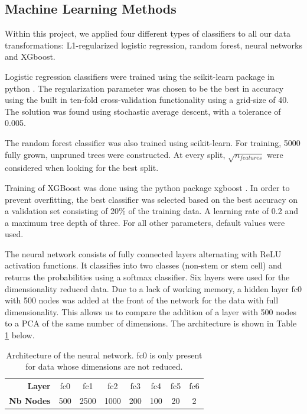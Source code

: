 \documentclass[10pt,conference,compsocconf]{IEEEtran}
\begin{document}
\subsection{Machine Learning Methods}
Within this project, we applied four different types of classifiers to all our data transformations: L1-regularized logistic regression, random forest, neural networks and XGboost.
\par
Logistic regression classifiers were trained using the scikit-learn package in python \cite{scikit-learn}. The regularization parameter was chosen to be the best in accuracy using the built in ten-fold cross-validation functionality using a grid-size of 40. The solution was found using stochastic average descent, with a tolerance of 0.005. 
\par
The random forest classifier was also trained using scikit-learn. For training, 5000 fully grown, unpruned trees were constructed. At every split, $\sqrt{n_{features}}$ were considered when looking for the best split.
\par
Training of XGBoost was done using the python package xgboost \cite{Chen:2016:XST:2939672.2939785}. In order to prevent overfitting, the best classifier was selected based on the best  accuracy on a validation set consisting of 20\% of the training data. A learning rate of 0.2 and a maximum tree depth of three. For all other parameters, default values were used.  
\par
The neural network consists of fully connected layers alternating with ReLU activation functions. It classifies into two classes (non-stem or stem cell) and returns the probabilities using a softmax classifier. Six layers were used for the dimensionality reduced data. Due to a lack of working memory, a hidden layer fc0 with 500 nodes was added at the front of the network for the data with full dimensionality. This allows us to compare the addition of a layer with 500 nodes to a PCA of the same number of dimensions. The architecture is shown in Table \ref{tab:ArchitectureNN} below.

\begin{table}[H]
	\centering
	\begin{tabular}{rccccccc}
\hline
  \textbf{Layer} &  fc0 &  fc1 & fc2 & fc3 & fc4 & fc5 & fc6 \\
  \textbf{Nb Nodes} &  500 &  2500 & 1000 & 200 & 100 & 20 & 2 \\
\hline
\end{tabular}
	\caption{Architecture of the neural network. fc0 is only present for data whose dimensions are not reduced.}
	\label{tab:ArchitectureNN}
	\vspace{-8mm}
\end{table}
\end{document}
